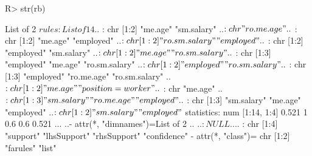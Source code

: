 \documentclass{article}\usepackage[]{graphicx}\usepackage[]{color}
\begin{document}
\begin{Schunk}
% --begin: "searchrules2"
\begin{Sinput}
R> str(rb)
\end{Sinput}
\begin{Soutput}
List of 2
 $ rules     :List of 14
  ..$ : chr [1:2] "me.age" "sm.salary"
  ..$ : chr "ro.me.age"
  ..$ : chr [1:2] "me.age" "employed"
  ..$ : chr [1:2] "ro.sm.salary" "employed"
  ..$ : chr [1:2] "employed" "sm.salary"
  ..$ : chr [1:2] "me.age" "ro.sm.salary"
  ..$ : chr [1:3] "employed" "me.age" "ro.sm.salary"
  ..$ : chr [1:2] "employed" "ro.sm.salary"
  ..$ : chr [1:3] "employed" "ro.me.age" "ro.sm.salary"
  ..$ : chr [1:2] "me.age" "position=worker"
  ..$ : chr "me.age"
  ..$ : chr [1:3] "sm.salary" "ro.me.age" "employed"
  ..$ : chr [1:3] "sm.salary" "me.age" "employed"
  ..$ : chr [1:2] "sm.salary" "employed"
 $ statistics: num [1:14, 1:4] 0.521 1 0.6 0.6 0.521 ...
  ..- attr(*, "dimnames")=List of 2
  .. ..$ : NULL
  .. ..$ : chr [1:4] "support" "lhsSupport" "rhsSupport" "confidence"
 - attr(*, "class")= chr [1:2] "farules" "list"
\end{Soutput}
%
% --end: "searchrules2"
\end{Schunk}
\end{document}
